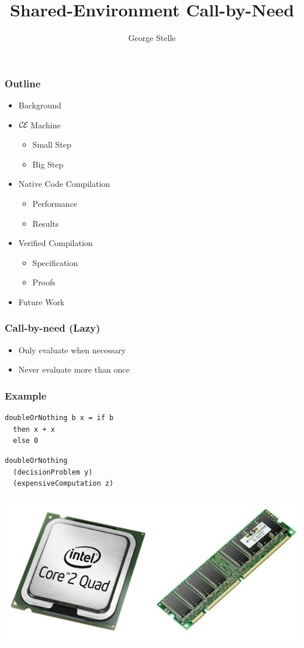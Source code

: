 \documentclass[17pt]{beamer}
\title{Shared-Environment Call-by-Need}
\author{George Stelle}
\institute{University of New Mexico}
\date{}
\def\ce{$\mathcal{\mathcal{C} \mskip -1mu \mathcal{E}} \mskip 4mu$}
\begin{document}
\frame{\titlepage}

\begin{frame}
\frametitle{Outline}
\begin{itemize}
\item Background
\item \ce Machine
\begin{itemize}
\item Small Step
\item Big Step
\end{itemize}
\item Native Code Compilation
\begin{itemize}
\item Performance 
\item Results
\end{itemize}
\item Verified Compilation
\begin{itemize}
\item Specification
\item Proofs
\end{itemize}
\item Future Work
\end{itemize}
\end{frame}

\begin{frame}
\frametitle{Call-by-need (Lazy)}
\begin{itemize}
\item Only evaluate when necessary
\item Never evaluate more than once
\end{itemize}
\end{frame}

\begin{frame}[fragile]
\frametitle{Example}
\begin{lstlisting}[frame=single]
doubleOrNothing b x = if b 
  then x + x
  else 0
\end{lstlisting}
\begin{lstlisting}[frame=single]
doubleOrNothing 
  (decisionProblem y) 
  (expensiveComputation z)
\end{lstlisting}
\end{frame}

\begin{frame}
\hspace*{-11.2mm}
\includegraphics[width=\paperwidth]{cpumemory}
\end{frame}
\end{document}
